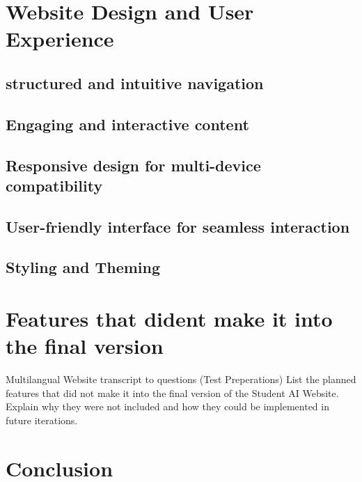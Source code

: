 
\section{Website Design and User Experience} 


\subsection{structured and intuitive navigation}

\subsection{Engaging and interactive content}

\subsection{Responsive design for multi-device compatibility}

\subsection{User-friendly interface for seamless interaction}

\subsection{Styling and Theming}

\section{Features that dident make it into the final version}

Multilangual Website 
transcript to questions (Test Preperations)
List the planned features that did not make it into the final version of the Student AI Website.
Explain why they were not included and how they could be implemented in future iterations.

\section{Conclusion}





